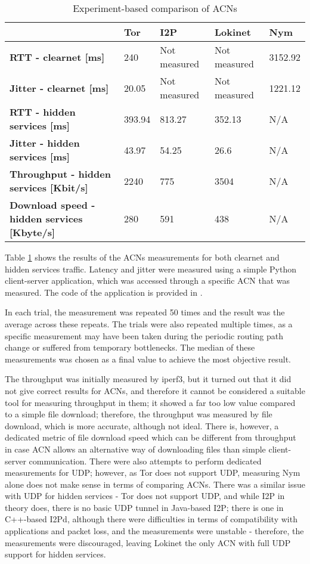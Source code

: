 \begin{table}[!ht]
\caption{Experiment-based comparison of ACNs}
\label{tab:experiment_comparison}
\small
\begin{tabular}{|p{}|p{}|p{}|p{}|p{}|}
\hline
\textbf{} & \textbf{Tor} & \textbf{I2P} & \textbf{Lokinet} & \textbf{Nym} \\
\hline
\textbf{RTT - clearnet [ms]} & 240 & Not measured & Not measured & 3152.92 \\
\hline
\textbf{Jitter - clearnet [ms]} & 20.05 & Not measured & Not measured & 1221.12 \\
\hline
\textbf{RTT - hidden services [ms]} & 393.94 & 813.27 & 352.13 & N/A \\
\hline
\textbf{Jitter - hidden services [ms]} & 43.97 & 54.25 & 26.6 & N/A \\
\hline
\textbf{Throughput - hidden services [Kbit/s]} & 2240 & 775 & 3504 & N/A \\
\hline
\textbf{Download speed - hidden services [Kbyte/s]} & 280 & 591 & 438 & N/A \\
\hline
\end{tabular}
\end{table}

Table \ref{tab:experiment_comparison} shows the results of the ACNs measurements for both clearnet and hidden services traffic.
Latency and jitter were measured using a simple Python client-server application, which was accessed through a specific ACN that was measured. The code of the application is provided in .

In each trial, the measurement was repeated 50 times and the result was the average across these repeats. The trials were also repeated multiple times, as a specific measurement may have been taken during the periodic routing path change or suffered from temporary bottlenecks. The median of these measurements was chosen as a final value to achieve the most objective result.

The throughput was initially measured by iperf3, but it turned out that it did not give correct results for ACNs, and therefore it cannot be considered a suitable tool for measuring throughput in them; it showed a far too low value compared to a simple file download; therefore, the throughput was measured by file download, which is more accurate, although not ideal. There is, however, a dedicated metric of file download speed which can be different from throughput in case ACN allows an alternative way of downloading files than simple client-server communication. There were also attempts to perform dedicated measurements for UDP; however, as Tor does not support UDP, measuring Nym alone does not make sense in terms of comparing ACNs. There was a similar issue with UDP for hidden services - Tor does not support UDP, and while I2P in theory does, there is no basic UDP tunnel in Java-based I2P; there is one in C++-based I2Pd, although there were difficulties in terms of compatibility with applications and packet loss, and the measurements were unstable - therefore, the measurements were discouraged, leaving Lokinet the only ACN with full UDP support for hidden services.

